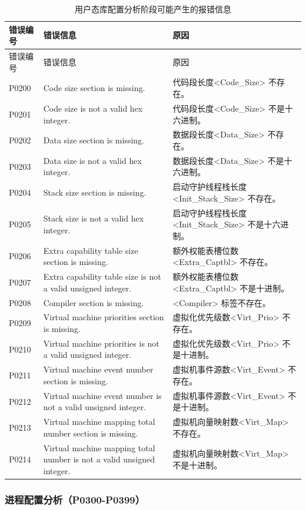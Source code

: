 \begin{xltabular}{\textwidth}{@{}>{\hsize\raggedright\arraybackslash}X>{\hsize\raggedright\arraybackslash}X>{\hsize\raggedright\arraybackslash}X@{}}
\caption{用户态库配置分析阶段可能产生的报错信息}\label{tab:5-5}\\
\toprule
错误编号 & 错误信息 & 原因\tabularnewline
\endfirsthead
\toprule
错误编号 & 错误信息 & 原因\tabularnewline
\midrule
\endhead
\bottomrule
\endlastfoot
P0200 & Code size section is missing. &
代码段长度<Code\_\allowbreak{}Size> 不存在。\tabularnewline
P0201 & Code size is not a valid hex integer. &
代码段长度<Code\_\allowbreak{}Size> 不是十六进制。\tabularnewline
P0202 & Data size section is missing. &
数据段长度<Data\_\allowbreak{}Size> 不存在。\tabularnewline
P0203 & Data size is not a valid hex integer. &
数据段长度<Data\_\allowbreak{}Size> 不是十六进制。\tabularnewline
P0204 & Stack size section is missing. &
启动守护线程栈长度<Init\_\allowbreak{}Stack\_\allowbreak{}Size> 不存在。\tabularnewline
P0205 & Stack size is not a valid hex integer. &
启动守护线程栈长度<Init\_\allowbreak{}Stack\_\allowbreak{}Size> 不是十六进制。\tabularnewline
P0206 & Extra capability table size section is missing. &
额外权能表槽位数<Extra\_\allowbreak{}Captbl> 不存在。\tabularnewline
P0207 & Extra capability table size is not a valid unsigned integer. &
额外权能表槽位数<Extra\_\allowbreak{}Captbl> 不是十进制。\tabularnewline
P0208 & Compiler section is missing. &
<Compiler> 标签不存在。\tabularnewline
P0209 & Virtual machine priorities section is missing. &
虚拟化优先级数<Virt\_\allowbreak{}Prio> 不存在。\tabularnewline
P0210 & Virtual machine priorities is not a valid unsigned integer. &
虚拟化优先级数<Virt\_\allowbreak{}Prio> 不是十进制。\tabularnewline
P0211 & Virtual machine event number section is missing. &
虚拟机事件源数<Virt\_\allowbreak{}Event> 不存在。\tabularnewline
P0212 & Virtual machine event number is not a valid unsigned integer. &
虚拟机事件源数<Virt\_\allowbreak{}Event> 不是十进制。\tabularnewline
P0213 & Virtual machine mapping total number section is missing. &
虚拟机向量映射数<Virt\_\allowbreak{}Map> 不存在。\tabularnewline
P0214 & Virtual machine mapping total number is not a valid unsigned
integer. &
虚拟机向量映射数<Virt\_\allowbreak{}Map> 不是十进制。\tabularnewline
\end{xltabular}

\subsubsection{进程配置分析（P0300-P0399）}\label{subsubsec:5-6-2-4}

